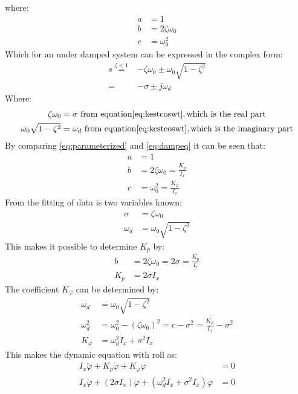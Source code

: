 where:
\begin{align}
a &= 1\\
b &= 2\zeta \omega_0\\
c &= \omega_0^2
\end{align}
Which for an under damped system can be expressed in the complex form:
\begin{align}
s \stackrel{\zeta < 1}{=} &-\zeta\omega_0\pm\omega_0\sqrt{1-\zeta^2}\\
= &-\sigma\pm j\omega_d
\end{align}
Where:
\begin{align}
\zeta\omega_0 &= \sigma\ \text{from equation} \ref{eq:kestcoswt}, \text{which is the real part}\\
\omega_0\sqrt{1-\zeta^2} &= \omega_d\ \text{from equation} \ref{eq:kestcoswt}, \text{which is the imaginary part}
\end{align}
By comparing \ref{eq:parameterized} and \ref{eq:dampeq} it can be seen that:
\begin{align}
a &= 1\\
b &= 2\zeta\omega_0 = \frac{K_p}{I_x}\\
c &= \omega_0^2 = \frac{K_\varphi}{I_x}
\end{align}
From the fitting of data is two variables known:
\begin{align}
\sigma &= \zeta\omega_0\\
\omega_d&=\omega_0\sqrt{1-\zeta^2}
\end{align}
This makes it possible to determine $K_p$ by:
\begin{align}
b &= 2\zeta\omega_0 = 2\sigma = \frac{K_p}{I_x}\\
K_p &= 2\sigma I_x
\end{align}
The coefficient $K_\varphi$ can be determined by: 
\begin{align}
\omega_d &= \omega_0\sqrt{1-\zeta^2}\\
\omega_d^2 &= \omega_0^2-(\zeta\omega_0)^2 = c - \sigma^2 = \frac{K_\varphi}{I_x}-\sigma^2\\
K_\varphi &= \omega_d^2I_x+\sigma^2I_x
\end{align}
This makes the dynamic equation with roll as:
\begin{align}
I_x\ddot \varphi + K_p\dot\varphi + K_\varphi\varphi &= 0\\
I_x\ddot \varphi + (2\sigma I_x)\dot \varphi + (\omega_d^2I_x+\sigma^2I_x)\varphi &= 0
\label{eq:solveddyneq}
\end{align}


